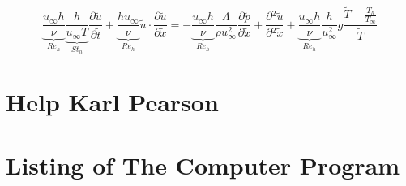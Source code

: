\documentclass[11pt, a4paper]{article}
\newcommand{\parder}[2]{\frac{\partial {#1}}{\partial {#2}}}
\begin{document}
\begin{equation}
    \underbrace{\frac{u_\infty h}{\nu}}_\text{$Re_h$}\underbrace{\frac{h}{u_\infty T}}_\text{$St_h$}\parder{\tilde{u}}{\tilde{t}}+\underbrace{\frac{h u_\infty}{\nu}}_\text{$Re_h$}\tilde{u}\cdot\parder{\tilde{u}}{\tilde{x}}=-\underbrace{\frac{u_\infty h}{\nu}}_\text{$Re_h$}\frac{\Lambda}{\rho u_\infty^2}\parder{\tilde{p}}{\tilde{x}}+\parder{^2\tilde{u}}{^2\tilde{x}}+\underbrace{\frac{u_\infty h}{\nu}}_\text{$Re_h$}\frac{h}{u_\infty^2}g\frac{\tilde{T}-\displaystyle\frac{T_h}{T_\infty}}{\tilde{T}}
\end{equation}

\section{Help Karl Pearson}





\newpage
\appendix
\section{Listing of The Computer Program}

\end{document}
